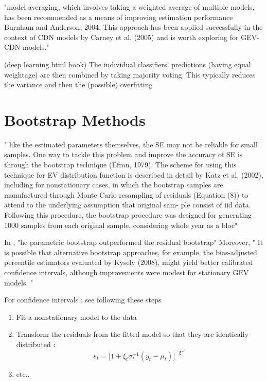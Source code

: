 \documentclass[11pt,a4paper,openany ]{book}
\begin{document}
"model averaging, which involves taking a weighted average of
multiple models, has been recommended as a means of
improving estimation performance Burnham and Anderson, 2004. This approach has been applied successfully
in the context of CDN models by Carney et al. (2005)
and is worth exploring for GEV-CDN models."


\citet[pp.256-267]{Goodfellow-et-al-2016}  (deep learning html book)    The  individual  classifiers’  predictions  (having
equal  weightage)  are  then  combined  by  taking  majority voting. This typically reduces the variance and then the (possible) overfitting






\section{Bootstrap Methods}

" like
the estimated parameters themselves, the SE may not be
reliable for small samples. One way to tackle this problem and improve the accuracy of SE is through the bootstrap technique (Efron, 1979). The scheme for using this technique for EV distribution  function is described in detail by Katz et al. (2002), including for nonstationary cases,
in which the bootstrap samples are manufactured through
Monte  Carlo  resampling  of  residuals  (Equation (8))  to attend  to  the  underlying  assumption  that  original  sam-
ple  consist  of  iid  data.  Following  this procedure,  the bootstrap  procedure  was  designed  for  generating  1000
samples  from  each  original  sample,  considering  whole year  as  a  bloc"


In \citet{cannon_flexible_2010}, "he parametric bootstrap outperformed the residual bootstrap"
Moreover, " It is possible that alternative bootstrap approaches, for example, the bias-adjusted percentile estimators evaluated by Kysely
(2008), might yield better calibrated confidence intervals, although improvements were modest for stationary GEV models. "


For confidence intervals : see \citet[pp.681]{cannon_flexible_2010} 
following these steps

\begin{enumerate}
	\item Fit a nonstationary model to the data
	\item Transform the residuals from the fitted model so that they are identically distributed :
	\begin{equation}
	\varepsilon_t=\bigg[1+\xi_t\sigma^{-1}_t(y_t-\mu_t)\bigg]^{-\xi^{-1}}
	\end{equation}
	\item etc..
\end{enumerate}
\end{document}
